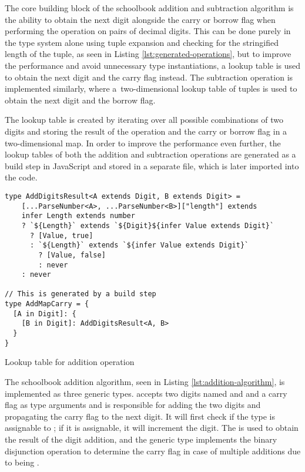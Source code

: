 The core building block of the schoolbook addition and subtraction algorithm is the ability to obtain the next digit alongside the carry or borrow flag when performing the operation on pairs of decimal digits. This can be done purely in the type system alone using tuple expansion and checking for the stringified length of the tuple, as seen in Listing \ref{lst:generated-operations}, but to improve the performance and avoid unnecessary type instantiations, a lookup table is used to obtain the next digit and the carry flag instead. The subtraction operation is implemented similarly, where a~two-dimensional lookup table of tuples is used to obtain the next digit and the borrow flag.

The lookup table is created by iterating over all possible combinations of two digits and storing the result of the operation and the carry or borrow flag in a two-dimensional map. In order to improve the performance even further, the lookup tables of both the addition and subtraction operations are generated as a build step in JavaScript and stored in a separate file, which is later imported into the code.

\begin{listing}[ht]
  \begin{verbatim}
type AddDigitsResult<A extends Digit, B extends Digit> =
    [...ParseNumber<A>, ...ParseNumber<B>]["length"] extends 
    infer Length extends number
    ? `${Length}` extends `${Digit}${infer Value extends Digit}`
      ? [Value, true]
      : `${Length}` extends `${infer Value extends Digit}`
        ? [Value, false]
        : never
    : never

// This is generated by a build step
type AddMapCarry = {
  [A in Digit]: {
    [B in Digit]: AddDigitsResult<A, B>
  }
}
\end{verbatim}
  \caption{Lookup table for addition operation}\label{lst:generated-operations}
\end{listing}

The schoolbook addition algorithm, seen in Listing \ref{lst:addition-algorithm}, is implemented as three generic types.  accepts two digits named  and  and a carry flag as type arguments and is responsible for adding the two digits and propagating the carry flag to the next digit. It will first check if the  type is assignable to ; if it is assignable, it will increment the  digit. The  is used to obtain the result of the digit addition, and the  generic type implements the binary disjunction operation to determine the carry flag in case of multiple additions due to  being .

